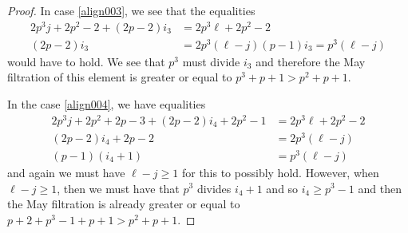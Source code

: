 \begin{proof}
 In case \eqref{align003}, we see that the equalities
 \begin{align*}
 2 p^3j+2p^2-2 +(2p-2)i_3& =2p^3\ell+2p^2-2 \\
 (2p-2)i_3& =2p^3(\ell-j)
(p-1)i_3=p^3(\ell-j)
  \end{align*}
  would have to hold. We see that $p^3$ must divide $i_3$ and therefore the May filtration of this element is greater or equal to $p^3+p+1>p^2+p+1$. 
  
In the case \eqref{align004}, we have equalities
\begin{align*}
2p^3j+2p^2+2p-3+(2p-2)i_4+2p^2-1&=2p^3\ell+2p^2-2  \\
(2p-2)i_4+2p-2& = 2p^3(\ell-j) \\
(p-1)(i_4+1)& =p^3(\ell-j) 
\end{align*}
and again we must have $\ell-j\ge 1$ for this to possibly hold. However, when $\ell-j\ge 1$, then we must have that $p^3$ divides $i_4+1$ and so $i_4\ge p^3-1$ and then the May filtration is already greater or equal to $p+2+p^3-1+p+1> p^2+p+1$. 


\end{proof}

